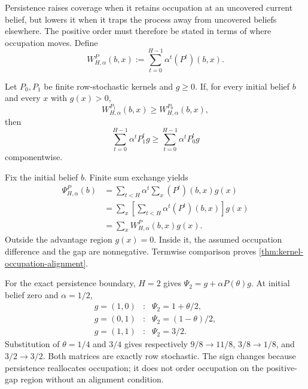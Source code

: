 Persistence raises coverage when it retains occupation at an uncovered
current belief, but lowers it when it traps the process away from uncovered
beliefs elsewhere.  The positive order must therefore be stated in terms of
where occupation moves.  Define
\[
 W^P_{H,\alpha}(b,x)
 :=\sum_{t=0}^{H-1}\alpha^t(P^t)(b,x).
\]

\begin{theorem}
\label{thm:kernel-occupation-alignment}
Let \(P_0,P_1\) be finite row-stochastic kernels and \(g\ge0\).  If, for every
initial belief \(b\) and every \(x\) with \(g(x)>0\),
\[
  W^{P_1}_{H,\alpha}(b,x)\ge W^{P_0}_{H,\alpha}(b,x),
\]
then
\[
  \sum_{t=0}^{H-1}\alpha^tP_1^tg
  \ge
  \sum_{t=0}^{H-1}\alpha^tP_0^tg
\]
componentwise.
\end{theorem}

Fix the initial belief \(b\).  Finite sum exchange yields
\[
\begin{aligned}
 \Psi^P_{H,\alpha}(b)
 &=\sum_{t<H}\alpha^t
   \sum_x(P^t)(b,x)g(x)\\
 &=\sum_x
   \left[\sum_{t<H}\alpha^t(P^t)(b,x)\right]g(x)\\
 &=\sum_xW^P_{H,\alpha}(b,x)g(x).
\end{aligned}
\]
Outside the advantage region \(g(x)=0\).  Inside it, the assumed occupation
difference and the gap are nonnegative.  Termwise comparison proves
\cref{thm:kernel-occupation-alignment}.

For the exact persistence boundary, \(H=2\) gives
\(\Psi_2=g+\alpha P(\theta)g\).  At initial belief zero and
\(\alpha=1/2\),
\[
\begin{array}{ccl}
g=(1,0)&:&\Psi_2=1+\theta/2,\\
g=(0,1)&:&\Psi_2=(1-\theta)/2,\\
g=(1,1)&:&\Psi_2=3/2.
\end{array}
\]
Substitution of \(\theta=1/4\) and \(3/4\) gives respectively
\(9/8\to11/8\), \(3/8\to1/8\), and \(3/2\to3/2\).  Both matrices are exactly
row stochastic.  The sign changes because persistence reallocates occupation;
it does not order occupation on the positive-gap region without an alignment
condition.
